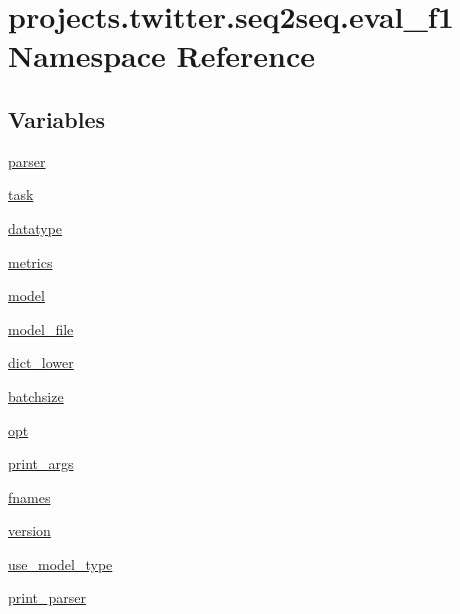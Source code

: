 \hypertarget{namespaceprojects_1_1twitter_1_1seq2seq_1_1eval__f1}{}\section{projects.\+twitter.\+seq2seq.\+eval\+\_\+f1 Namespace Reference}
\label{namespaceprojects_1_1twitter_1_1seq2seq_1_1eval__f1}
\subsection*{Variables}
\begin{DoxyCompactItemize}
\item 
\hyperlink{namespaceprojects_1_1twitter_1_1seq2seq_1_1eval__f1_ad558cbec4682c008ec6e7e47c9f2c86f}{parser}
\item 
\hyperlink{namespaceprojects_1_1twitter_1_1seq2seq_1_1eval__f1_a1904a41b81d22bb924ac856a04516a49}{task}
\item 
\hyperlink{namespaceprojects_1_1twitter_1_1seq2seq_1_1eval__f1_abec81d673046392077c8a5664f1be3c1}{datatype}
\item 
\hyperlink{namespaceprojects_1_1twitter_1_1seq2seq_1_1eval__f1_a7ffcfac8a21f48fd5090f37e620fff9a}{metrics}
\item 
\hyperlink{namespaceprojects_1_1twitter_1_1seq2seq_1_1eval__f1_a2208e778d80c4addea6f3813f8ecf512}{model}
\item 
\hyperlink{namespaceprojects_1_1twitter_1_1seq2seq_1_1eval__f1_aa19980951f705066f6262529a5e03402}{model\+\_\+file}
\item 
\hyperlink{namespaceprojects_1_1twitter_1_1seq2seq_1_1eval__f1_a98e83445f8d5caf493455df899e4931d}{dict\+\_\+lower}
\item 
\hyperlink{namespaceprojects_1_1twitter_1_1seq2seq_1_1eval__f1_a227db40ed8ddb1860fafde63b2491bdb}{batchsize}
\item 
\hyperlink{namespaceprojects_1_1twitter_1_1seq2seq_1_1eval__f1_ae2ccb62e5a028bc84095dfcb55b8cfa4}{opt}
\item 
\hyperlink{namespaceprojects_1_1twitter_1_1seq2seq_1_1eval__f1_afeef4b8323b9f23b557386828f33c6c8}{print\+\_\+args}
\item 
\hyperlink{namespaceprojects_1_1twitter_1_1seq2seq_1_1eval__f1_a0cb677281512e90205d9243b0d3dfd04}{fnames}
\item 
\hyperlink{namespaceprojects_1_1twitter_1_1seq2seq_1_1eval__f1_afd98e55a77b1a26d450a72984100a1f1}{version}
\item 
\hyperlink{namespaceprojects_1_1twitter_1_1seq2seq_1_1eval__f1_aa085d0594e97641873a197556a53448c}{use\+\_\+model\+\_\+type}
\item 
\hyperlink{namespaceprojects_1_1twitter_1_1seq2seq_1_1eval__f1_a43266e8d073c7dd7ead285ec769f1443}{print\+\_\+parser}
\end{DoxyCompactItemize}


